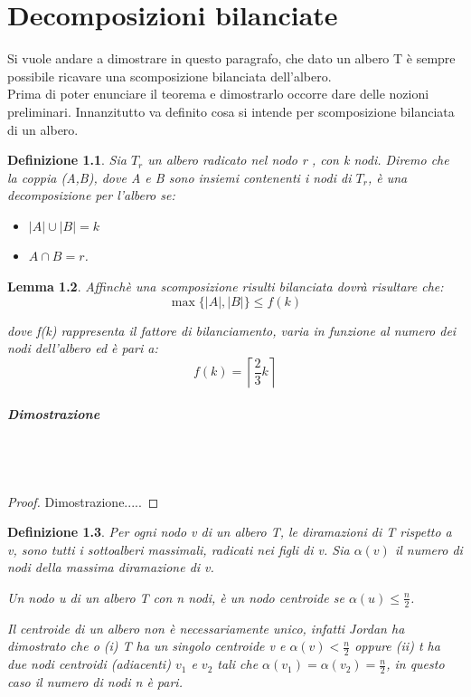 \chapter{Decomposizioni bilanciate}

Si vuole andare a dimostrare in questo paragrafo, che dato un albero T \`e sempre possibile ricavare una scomposizione bilanciata dell'albero.
\\
Prima di poter enunciare il teorema e dimostrarlo occorre dare delle nozioni preliminari.
Innanzitutto va definito cosa si intende per scomposizione bilanciata di un albero.
\newtheorem{definizione}{Definizione}[chapter]
\newtheorem{lemma}[definizione]{Lemma}
\begin{definizione}
Sia $T_r$ un albero radicato nel nodo r , con k nodi.
Diremo che la coppia (A,B), dove  A e B sono insiemi contenenti i nodi di $T_r$, \`e una decomposizione per l'albero se:
\begin{itemize}
	\item $| A |\cup| B | = k$
	\item $A \cap B = r$.
\end{itemize}
\end{definizione}

\begin{lemma}
Affinch\`e una scomposizione risulti bilanciata dovr\`a risultare che:
\begin{equation*}
	\max{ \{|A| , |B| \} }  \le  f(k)
\end{equation*}


dove f(k) rappresenta il fattore di bilanciamento, varia in funzione al numero dei nodi dell'albero ed \`e pari a:
\begin{equation*}
f(k) = \left\lceil \frac{2}{3}  k  \right\rceil
\end{equation*}
\end{lemma}

\paragraph{Dimostrazione}\mbox{}\\\\
\begin{proof}
	Dimostrazione.....
\end{proof}

\begin{definizione}
Per ogni nodo v di un albero T, le diramazioni di T  rispetto a v, sono tutti i sottoalberi massimali, radicati nei figli di v. 
Sia $\alpha(v)$ il numero di nodi della massima diramazione di v. 

Un nodo u di un albero T con n nodi, \`e un nodo centroide se $\alpha(u)\le\frac{n}{2}$.

Il centroide di un albero non \`e necessariamente unico, infatti Jordan \cite{jordan1869assemblages}  ha dimostrato che o (i) T ha un singolo centroide v e $\alpha(v) < \frac{n}{2}$ oppure (ii) t ha due nodi centroidi (adiacenti) $v_1$ e $v_2$ tali che $\alpha(v_1) = \alpha(v_2) = \frac{n}{2}$, in questo caso il numero di nodi n \`e pari.
\end{definizione}

